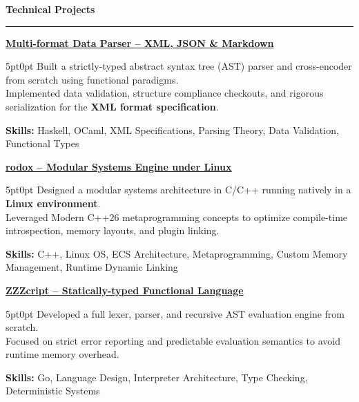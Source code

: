 \documentclass[9pt]{extarticle}
\begin{document}
\par\vspace{5pt}


{\large\bfseries Technical Projects}
\par\vspace{-8pt}
\rule{\linewidth}{0.4pt}
\par\vspace{5pt}

\underline{\bfseries Multi-format Data Parser -- XML, JSON \& Markdown}
\par
\begin{adjustwidth}{5pt}{0pt}
    Built a strictly-typed abstract syntax tree (AST) parser and cross-encoder from scratch using functional paradigms. \\
    Implemented data validation, structure compliance checkouts, and rigorous serialization for the {\bfseries XML format specification}.
\end{adjustwidth}
\par
{\bfseries Skills:} Haskell, OCaml, XML Specifications, Parsing Theory, Data Validation, Functional Types

\par\vspace{8pt}

\underline{\bfseries rodox -- Modular Systems Engine under Linux}
\par
\begin{adjustwidth}{5pt}{0pt}
    Designed a modular systems architecture in C/C++ running natively in a {\bfseries Linux environment}. \\
    Leveraged Modern C++26 metaprogramming concepts to optimize compile-time introspection, memory layouts, and plugin linking.
\end{adjustwidth}
\par
{\bfseries Skills:} C++, Linux OS, ECS Architecture, Metaprogramming, Custom Memory Management, Runtime Dynamic Linking

\par\vspace{8pt}

\underline{\bfseries ZZZcript -- Statically-typed Functional Language}
\par
\begin{adjustwidth}{5pt}{0pt}
    Developed a full lexer, parser, and recursive AST evaluation engine from scratch. \\
    Focused on strict error reporting and predictable evaluation semantics to avoid runtime memory overhead.
\end{adjustwidth}
\par
{\bfseries Skills:} Go, Language Design, Interpreter Architecture, Type Checking, Deterministic Systems
\end{document}
